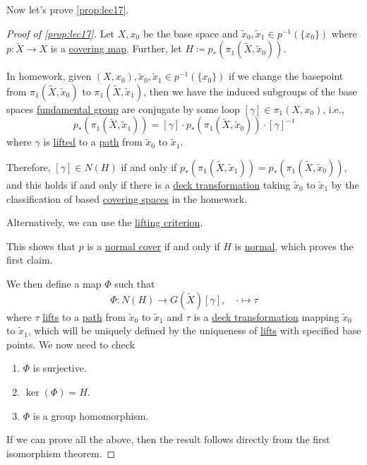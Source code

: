 Now let's prove \autoref{prop:lec17}.
\begin{proof}[Proof of \autoref{prop:lec17}]
	Let \(X, x_0\) be the base space and \(\widetilde{x} _0, \widetilde{x} _1\in p^{-1} (\{x_0\})\) where \(p\colon \widetilde{X} \to X\) is a
	\hyperref[def:covering-map]{covering map}. Further, let \(H\coloneqq p_\ast(\pi _1(\widetilde{X} , \widetilde{x} _0))\).

	In homework, given \((X, x_0), \widetilde{x} _0, \widetilde{x} _1\in p^{-1} (\{x_0\})\) if we change the basepoint from \(\pi _1(\widetilde{X} , \widetilde{x} _0)\)
	to \(\pi _1(\widetilde{X} , \widetilde{x} _1)\), then we have the induced subgroups of the base spaces \hyperref[def:fundamental-group]{fundamental group}
	are conjugate by some loop \([\gamma ]\in \pi _1(X, x_0)\), i.e.,
	\[
		p_\ast (\pi _1(\widetilde{X} , \widetilde{x} _1)) = [\gamma ]\cdot p_\ast (\pi _1(\widetilde{X} , \widetilde{x} _0))\cdot [\gamma ]^{-1}
	\]
	where \(\gamma\) is \hyperref[prop:homotopy-lifting-property]{lifted} to a \hyperref[def:path]{path} from \(\widetilde{x} _0\) to \(\widetilde{x} _1\).

	\par Therefore, \([\gamma ]\in N(H)\) if and only if \(p_\ast(\pi _1(\widetilde{X} , \widetilde{x} _1)) = p_\ast(\pi _1(\widetilde{X} , \widetilde{x} _0))\),
	and this holds if and only if there is a \hyperref[def:deck-transformation]{deck transformation} taking \(\widetilde{x} _0\) to \(\widetilde{x} _1\)
	by the classification of based \hyperref[def:covering-space]{covering spaces} in the homework.
	\begin{note}
		Alternatively, we can use the \hyperref[prop:lifting-criterion]{lifting criterion}.
	\end{note}
	This shows that \(p\) is a \hyperref[def:normal-cover]{normal cover} if and only if \(H\) is \hyperref[def:normal-subgroup]{normal}, which proves the first claim.

	\par We then define a map \(\Phi \) such that
	\[
		\Phi \colon N(H)\to G(\widetilde{X} )[\gamma ],\quad \cdot \mapsto \tau
	\]
	where \(\tau \) \hyperref[prop:homotopy-lifting-property]{lifts} to a \hyperref[def:path]{path} from \(\widetilde{x} _0\) to \(\widetilde{x} _1\) and
	\(\tau \) is a \hyperref[def:deck-transformation]{deck transformation} mapping \(\widetilde{x} _0\) to \(\widetilde{x} _1\), which will be
	uniquely defined by the uniqueness of \hyperref[prop:homotopy-lifting-property]{lifts} with specified base points. We now need to check
	\begin{enumerate}
		\item \(\Phi \) is surjective.
		\item \(\ker  (\Phi )= H\).
		\item \(\Phi \) is a group homomorphism.
	\end{enumerate}
	If we can prove all the above, then the result follows directly from the first isomorphism theorem.


\end{proof}
